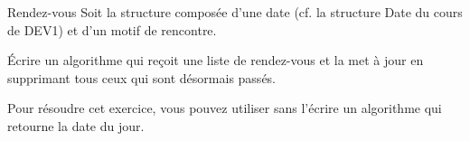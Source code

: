 		\begin{Exercice}{Rendez-vous}
			Soit la structure  composée 
			d’une date (cf. la structure Date du cours de DEV1)
			et d’un motif de rencontre. 
			
			\begin{LDA}
				\EndStruct
			\end{LDA}

			Écrire un algorithme qui reçoit une liste de rendez-vous 
			et la met à jour en supprimant tous ceux qui sont désormais passés. 			
			
			Pour résoudre cet exercice, vous pouvez utiliser sans l'écrire
			un algorithme  qui retourne la date du jour.
		\end{Exercice}
		
	
